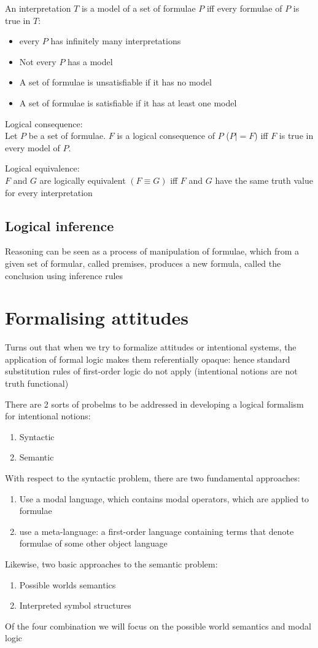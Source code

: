 An interpretation $T$ is a model of a set of formulae $P$ iff every formulae of $P$ is true in $T$:
\begin{itemize}
\item every $P$ has infinitely many interpretations
\item Not every $P$ has a model
\item A set of formulae is unsatisfiable if it has no model
\item A set of formulae is satisfiable if it has at least one model
\end{itemize}

Logical consequence:\\
Let $P$ be a set of formulae. $F$ is a logical consequence of $P$ ($P|=F$) iff $F$ is true in every model of $P$.

Logical equivalence:\\
$F$ and $G$ are logically equivalent $(F \equiv G)$ iff $F$ and $G$ have the same truth value for every interpretation
\subsection{Logical inference}
Reasoning can be seen as a process of manipulation of formulae, which from a given set of formular, called premises, produces a new formula, called the conclusion using inference rules

\section{Formalising attitudes}
Turns out that when we try to formalize attitudes or intentional systems, the application of formal logic makes them referentially opaque: hence standard substitution rules of first-order logic do not apply (intentional notions are not truth functional)

There are 2 sorts of probelms to be addressed in developing a logical formalism for intentional notions:
\begin{enumerate}
\item Syntactic
\item Semantic
\end{enumerate}
With respect to the syntactic problem, there are two fundamental approaches:
\begin{enumerate}
\item Use a modal language, which contains modal operators, which are applied to formulae
\item use a meta-language: a first-order language containing terms that denote formulae of some other object language
\end{enumerate}
Likewise, two basic approaches to the semantic problem:
\begin{enumerate}
\item Possible worlds semantics
\item Interpreted symbol structures
\end{enumerate}
Of the four combination we will focus on the possible world semantics and modal logic
